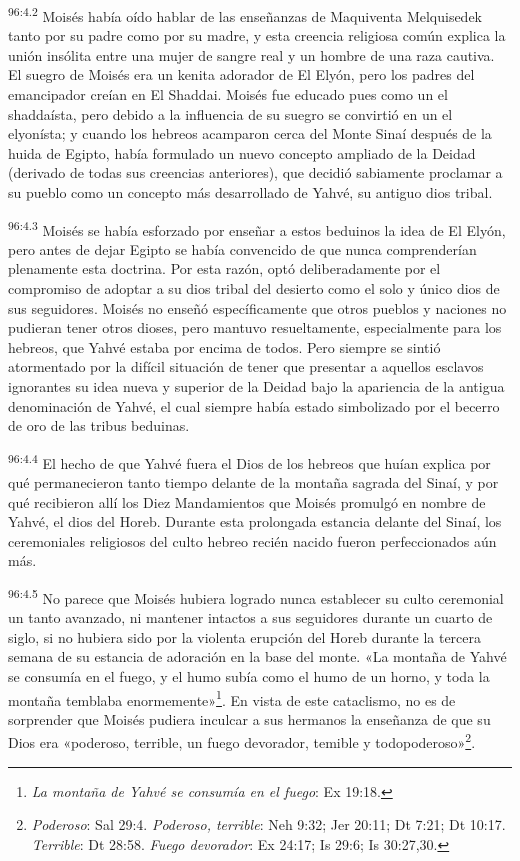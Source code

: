 \par
\textsuperscript{96:4.2} Moisés había oído hablar de las enseñanzas de Maquiventa Melquisedek tanto por su padre como por su madre, y esta creencia religiosa común explica la unión insólita entre una mujer de sangre real y un hombre de una raza cautiva. El suegro de Moisés era un kenita adorador de El Elyón, pero los padres del emancipador creían en El Shaddai. Moisés fue educado pues como un el shaddaísta, pero debido a la influencia de su suegro se convirtió en un el elyonísta; y cuando los hebreos acamparon cerca del Monte Sinaí después de la huida de Egipto, había formulado un nuevo concepto ampliado de la Deidad (derivado de todas sus creencias anteriores), que decidió sabiamente proclamar a su pueblo como un concepto más desarrollado de Yahvé, su antiguo dios tribal.

\par
\textsuperscript{96:4.3} Moisés se había esforzado por enseñar a estos beduinos la idea de El Elyón, pero antes de dejar Egipto se había convencido de que nunca comprenderían plenamente esta doctrina. Por esta razón, optó deliberadamente por el compromiso de adoptar a su dios tribal del desierto como el solo y único dios de sus seguidores. Moisés no enseñó específicamente que otros pueblos y naciones no pudieran tener otros dioses, pero mantuvo resueltamente, especialmente para los hebreos, que Yahvé estaba por encima de todos. Pero siempre se sintió atormentado por la difícil situación de tener que presentar a aquellos esclavos ignorantes su idea nueva y superior de la Deidad bajo la apariencia de la antigua denominación de Yahvé, el cual siempre había estado simbolizado por el becerro de oro de las tribus beduinas.

\par
\textsuperscript{96:4.4} El hecho de que Yahvé fuera el Dios de los hebreos que huían explica por qué permanecieron tanto tiempo delante de la montaña sagrada del Sinaí, y por qué recibieron allí los Diez Mandamientos que Moisés promulgó en nombre de Yahvé, el dios del Horeb. Durante esta prolongada estancia delante del Sinaí, los ceremoniales religiosos del culto hebreo recién nacido fueron perfeccionados aún más.

\par
\textsuperscript{96:4.5} No parece que Moisés hubiera logrado nunca establecer su culto ceremonial un tanto avanzado, ni mantener intactos a sus seguidores durante un cuarto de siglo, si no hubiera sido por la violenta erupción del Horeb durante la tercera semana de su estancia de adoración en la base del monte. «La montaña de Yahvé se consumía en el fuego, y el humo subía como el humo de un horno, y toda la montaña temblaba enormemente»\footnote{\textit{La montaña de Yahvé se consumía en el fuego}: Ex 19:18.}. En vista de este cataclismo, no es de sorprender que Moisés pudiera inculcar a sus hermanos la enseñanza de que su Dios era «poderoso, terrible, un fuego devorador, temible y todopoderoso»\footnote{\textit{Poderoso}: Sal 29:4. \textit{Poderoso, terrible}: Neh 9:32; Jer 20:11; Dt 7:21; Dt 10:17. \textit{Terrible}: Dt 28:58. \textit{Fuego devorador}: Ex 24:17; Is 29:6; Is 30:27,30.}.

